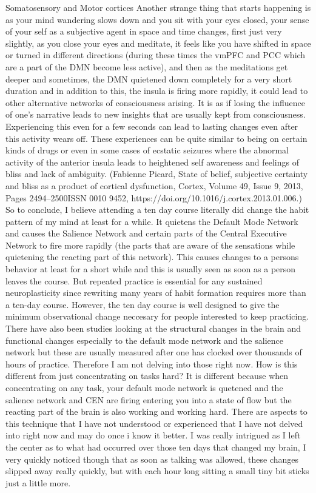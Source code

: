 \documentclass[twocolumn]{article}
\begin{document}
Somatosensory and Motor cortices
Another strange thing that starts happening is as your mind wandering slows down and you sit with your eyes closed, your sense of your self as a subjective agent in space and time changes, first just very slightly, as you close your eyes and meditate, it feels like you have shifted in space or turned in different directions (during these times the vmPFC and PCC which are a part of the DMN become less active), and then as the meditations get deeper and sometimes, the DMN quietened down completely for a very short duration and in addition to this, the insula is firing more rapidly, it could lead to other alternative networks of consciousness arising. It is as if losing the influence of one’s narrative leads to new insights that are usually kept from consciousness. Experiencing this even for a few seconds can lead to lasting changes even after this activity wears off. These experiences can be quite similar to being on certain kinds of drugs or even in some cases of ecstatic seizures where the abnormal activity of the anterior insula leads to heightened self awareness and feelings of bliss and lack of ambiguity. (Fabienne Picard, State of belief, subjective certainty and bliss as a product of cortical dysfunction, Cortex, Volume 49, Issue 9, 2013,
Pages 2494–2500ISSN 0010 9452, https://doi.org/10.1016/j.cortex.2013.01.006.)
So to conclude, I believe attending a ten day course literally did change the habit pattern of my mind at least for a while.
It quietens the Default Mode Network and causes the Salience Network and certain parts of the Central Executive Network to fire more rapidly (the parts that are aware of the sensations while quietening the reacting part of this network). This causes changes to a persons behavior at least for a short while and this is usually seen as soon as a person leaves the course. But repeated practice is essential for any sustained neuroplasticity since rewriting many years of habit formation requires more than a ten-day course. However, the ten day course is well designed to give the minimum observational change neccesary for people interested to keep practicing.
There have also been studies looking at the structural changes in the brain and functional changes especially to the default mode network and the salience network but these are usually measured after one has clocked over thousands of hours of practice. Therefore I am not delving into those right now.
How is this different from just concentrating on tasks hard? It is different because when concentrating on any task, your default mode network is quetened and the salience network and CEN are firing entering you into a state of flow but the reacting part of the brain is also working and working hard.
There are aspects to this technique that I have not understood or experienced that I have not delved into right now and may do once i know it better.
I was really intrigued as I left the center as to what had occurred over those ten days that changed my brain, I very quickly noticed though that as soon as talking was allowed, these changes slipped away really quickly, but with each hour long sitting a small tiny bit sticks just a little more.
\end{document}
